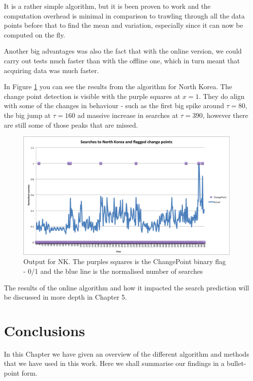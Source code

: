 \documentclass[minf,twoside,singlespacing,parskip,notimes,deptreport]{infthesis} %
\begin{document}
It is a rather simple algorithm, but it is been proven to work and the computation overhead is minimal in comparison to trawling through all the data points before that to find the mean and variation, especially since it can now be computed on the fly. 

Another big advantages was also the fact that with the online version, we could carry out tests much faster than with the offline one, which in turn meant that acquiring data was much faster. 

In Figure \ref{NK} you can see the results from the algorithm for North Korea. The change point detection is visible with the purple squares at $x=1$. They do align with some of the changes in behaviour - such as the first big spike around $\tau = 80$, the big jump at $\tau = 160$ ad massive increase in searches at $\tau = 390$, however there are still some of those peaks that are missed. 

\begin{figure}[h!]
\begin{center}
\includegraphics[width=\textwidth]{NK}
\end{center}
\caption{Output for NK. The purples squares is the ChangePoint binary flag - 0/1 and the blue line is the normalised number of searches}
\label{NK}
\end{figure}


The results of the online algorithm and how it impacted the search prediction will be discussed in more depth in Chapter 5. 

\newpage
\section{Conclusions}

In this Chapter we have given an overview of the different algorithm and methods that we have used in this work. Here we shall summarise our findings in a bullet-point form.
\end{document}
